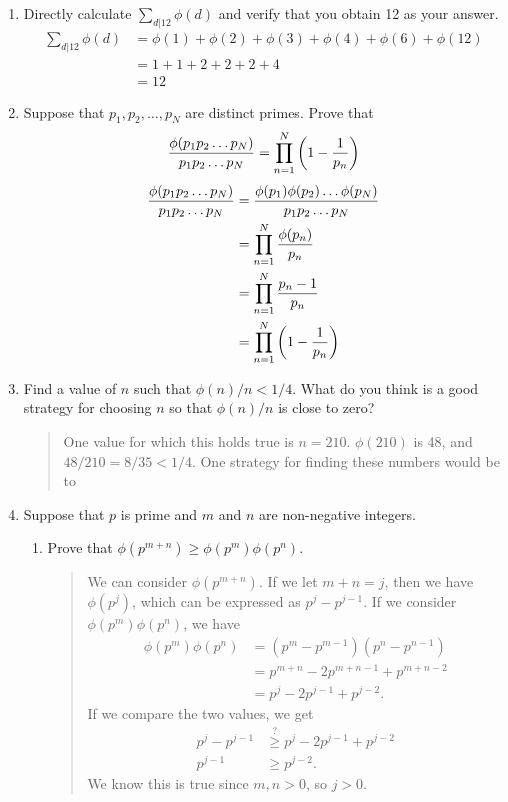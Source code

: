 \documentclass{hw}
\begin{document}

\begin{enumerate}
\item Directly calculate $\displaystyle\sum\limits_{d|12}\phi(d)$ and verify that you obtain 12 as your
answer.
\begin{align*}
\sum_{d|12}\phi(d) &= \phi(1) + \phi(2) + \phi(3) + \phi(4) + \phi(6) + \phi(12)\\
&= 1 + 1 + 2 + 2 + 2 + 4\\
&= 12
\end{align*}

\item Suppose that $p_{1},p_{2},\dots,p_{N}$ are distinct primes. Prove that
\[
{\phi(p_{1}p_{2}\dots p_{N}) \over p_{1}p_{2}\dots p_{N}}
=
\prod_{n=1}^{N}\left(1-{1\over p_{n}}\right)
\]
\begin{align*}
{\phi(p_{1}p_{2}\dots p_{N}) \over p_{1}p_{2}\dots p_{N}} &=
{\phi(p_{1})\phi(p_{2})\dots \phi(p_{N}) \over p_{1}p_{2}\dots p_{N}}\\
&= \prod_{n=1}^{N}{\phi(p_{n})\over p_{n}}\\
&= \prod_{n=1}^{N}{p_{n} -1 \over p_{n}}\\
&= \prod_{n=1}^{N}\left(1-{1\over p_{n}}\right)
\end{align*}

\item Find a value of $n$ such that $\phi(n)/n < 1/4$. What do you think is a good strategy for
choosing $n$ so that $\phi(n)/n$ is close to zero?
\begin{quote}
One value for which this holds true is $n=210$. $\phi(210)$ is 48, and $48/210 = 8/35 < 1/4$. One
strategy for finding these numbers would be to
\end{quote}

\item Suppose that $p$ is prime and $m$ and $n$ are non-negative integers.
\begin{enumerate}
\item Prove that $\phi(p^{m+n})\geq\phi(p^{m})\phi(p^{n})$.
\begin{quote}
We can consider $\phi(p^{m+n})$. If we let $m+n=j$, then we have $\phi(p^{j})$, which can be
expressed as $p^{j}-p^{j-1}$. If we consider $\phi(p^{m})\phi(p^{n})$, we have
\begin{align*}
\phi(p^{m})\phi(p^{n})&= (p^{m}-p^{m-1})(p^{n}-p^{n-1})\\
&= p^{m+n} - 2p^{m+n-1} + p^{m+n-2}\\
&= p^{j}-2p^{j-1}+p^{j-2}.
\end{align*}
If we compare the two values, we get
\begin{align*}
p^{j}-p^{j-1} &\stackrel{?}{\geq} p^{j}-2p^{j-1}+p^{j-2}\\
p^{j-1} &\geq p^{j-2}.
\end{align*}
We know this is true since $m,n>0$, so $j>0$.
\end{quote}


\end{enumerate}
\end{enumerate}
\end{document}
